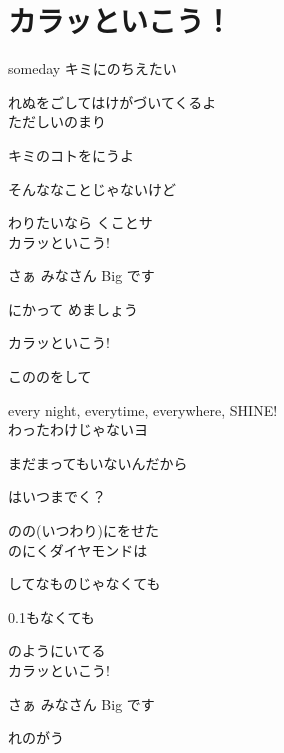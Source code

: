 \section{ カラッといこう！}
\large{

someday キミにのちえたい

れぬをごしてはけがづいてくるよ
\\

ただしいのまり

キミのコトをにうよ

そんななことじゃないけど

わりたいなら くことサ
\\

カラッといこう!

さぁ みなさん Big です

にかって めましょう

カラッといこう!

こののをして

every night, everytime, everywhere, SHINE!
\\

わったわけじゃないヨ

まだまってもいないんだから

はいつまでく？

のの(いつわり)にをせた
\\

のにくダイヤモンドは

してなものじゃなくても

0.1もなくても

のようにいてる
\\

カラッといこう!

さぁ みなさん Big です

れのがう

}
